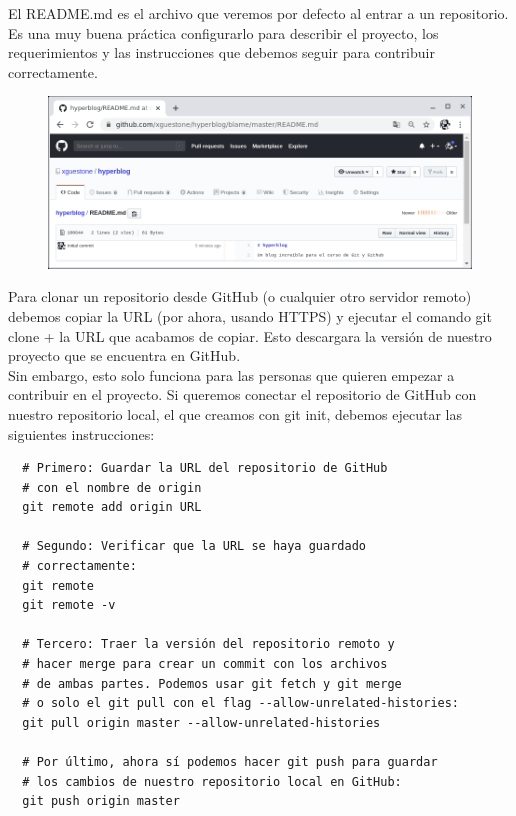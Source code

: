 \documentclass{article}
\begin{document}
El README.md es el archivo que veremos por defecto al entrar a un repositorio.
Es una muy buena práctica configurarlo para describir el proyecto, los
requerimientos y las instrucciones que debemos seguir para contribuir
correctamente.\\

\newpage

\begin{figure}[h!]
  \centering
  \includegraphics[scale=0.75]{./Pictures/187_repo_blame.png}
\end{figure}

Para clonar un repositorio desde GitHub (o cualquier otro servidor remoto)
debemos copiar la URL (por ahora, usando HTTPS) y ejecutar el comando git clone
+ la URL que acabamos de copiar. Esto descargara la versión de nuestro proyecto
que se encuentra en GitHub.\\

Sin embargo, esto solo funciona para las personas que quieren empezar a
contribuir en el proyecto. Si queremos conectar el repositorio de GitHub con
nuestro repositorio local, el que creamos con git init, debemos ejecutar las
siguientes instrucciones:\\

\begin{verbatim}
  # Primero: Guardar la URL del repositorio de GitHub
  # con el nombre de origin
  git remote add origin URL

  # Segundo: Verificar que la URL se haya guardado
  # correctamente:
  git remote
  git remote -v

  # Tercero: Traer la versión del repositorio remoto y
  # hacer merge para crear un commit con los archivos
  # de ambas partes. Podemos usar git fetch y git merge
  # o solo el git pull con el flag --allow-unrelated-histories:
  git pull origin master --allow-unrelated-histories

  # Por último, ahora sí podemos hacer git push para guardar
  # los cambios de nuestro repositorio local en GitHub:
  git push origin master
\end{verbatim}
\end{document}
